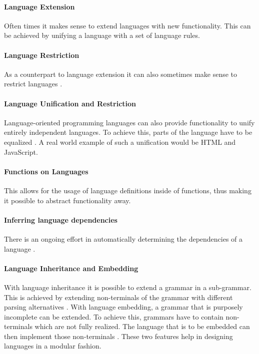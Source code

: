\paragraph{Language Extension}
Often times it makes sense to extend languages with new functionality. This can be achieved by unifying a language with a set of language rules.

\paragraph{Language Restriction}
As a counterpart to language extension it can also sometimes make sense to restrict languages \cite{erdweg_language_2012}.

\paragraph{Language Unification and Restriction}
Language-oriented programming languages can also provide functionality to unify entirely independent languages. To achieve this, parts of the language have to be equalized \cite{erdweg_language_2012}. A real world example of such a unification would be HTML and JavaScript.

\paragraph{Functions on Languages}
This allows for the usage of language definitions inside of functions, thus making it possible to abstract functionality away.

\paragraph{Inferring language dependencies}
There is an ongoing effort in automatically determining the dependencies of a language \cite{mendez-acuna_leveraging_2016,kuhn_choosy_2015,butting_modeling_2018}.


\paragraph{Language Inheritance and Embedding}
With language inheritance it is possible to extend a grammar in a sub-grammar. This is achieved by extending non-terminals of the grammar with different parsing alternatives \cite{krahn_monticore_2010}. With language embedding, a grammar that is purposely incomplete can be extended. To achieve this, grammars have to contain non-terminals which are not fully realized. The language that is to be embedded can then implement those non-terminals \cite{krahn_monticore_2010}. These two features help in designing languages in a modular fashion.


